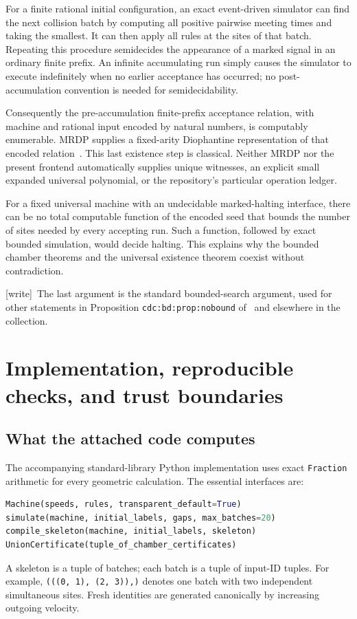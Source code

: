 \documentclass[11pt,letterpaper]{article}
\numberwithin{equation}{section}
\theoremstyle{definition}
\theoremstyle{remark}
\newcommand{\wtag}{\textup{[write]}}
\begin{document}
For a finite rational initial configuration, an exact event-driven simulator
can find the next collision batch by computing all positive pairwise meeting
times and taking the smallest. It can then apply all rules at the sites of
that batch. Repeating this procedure semidecides the appearance of a marked
signal in an ordinary finite prefix. An infinite accumulating run simply
causes the simulator to execute indefinitely when no earlier acceptance has
occurred; no post-accumulation convention is needed for semidecidability.

Consequently the pre-accumulation finite-prefix acceptance relation, with
machine and rational input encoded by natural numbers, is computably
enumerable. MRDP supplies a fixed-arity Diophantine representation of that
encoded relation~\cite{matiyasevich,afp}. This last existence step is
classical. Neither MRDP nor the present frontend automatically supplies
unique witnesses, an explicit small expanded universal polynomial, or the
repository's particular operation ledger.

For a fixed universal machine with an undecidable marked-halting interface,
there can be no total computable function of the encoded seed that bounds
the number of sites needed by every accepting run. Such a function, followed
by exact bounded simulation, would decide halting. This explains why the
bounded chamber theorems and the universal existence theorem coexist without
contradiction.


\wtag\ The last argument is the standard bounded-search argument, used for other statements in Proposition \texttt{cdc:bd:prop:nobound} of~\cite{cdc} and elsewhere in the collection.

\section{Implementation, reproducible checks, and trust boundaries}
\label{smc:cg:sec:implementation}

\subsection{What the attached code computes}

The accompanying standard-library Python implementation uses exact
\texttt{Fraction} arithmetic for every geometric calculation. The essential
interfaces are:
\begin{lstlisting}[language=Python]
Machine(speeds, rules, transparent_default=True)
simulate(machine, initial_labels, gaps, max_batches=20)
compile_skeleton(machine, initial_labels, skeleton)
UnionCertificate(tuple_of_chamber_certificates)
\end{lstlisting}
A skeleton is a tuple of batches; each batch is a tuple of input-ID tuples.
For example, \texttt{(((0, 1), (2, 3)),)} denotes one batch with two
independent simultaneous sites. Fresh identities are generated canonically
by increasing outgoing velocity.
\end{document}
